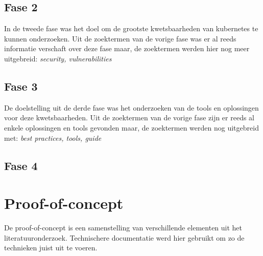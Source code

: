 \subsection{Fase 2}
In de tweede fase was het doel om de grootste kwetsbaarheden van kubernetes te kunnen onderzoeken. 
Uit de zoektermen van de vorige fase was er al reeds informatie verschaft over deze fase maar, de zoektermen werden hier nog meer uitgebreid: \textit{security, vulnerabilities}

\subsection{Fase 3}
De doelstelling uit de derde fase was het onderzoeken van de tools en oplossingen voor deze kwetsbaarheden. 
Uit de zoektermen van de vorige fase zijn er reeds al enkele oplossingen en tools gevonden maar, de zoektermen werden nog uitgebreid met: \textit{best practices, tools, guide}

\subsection{Fase 4}



\section{Proof-of-concept}
De proof-of-concept is een samenstelling van verschillende elementen uit het literatuuronderzoek. Technischere documentatie werd hier gebruikt om zo de technieken juist uit te voeren. 

